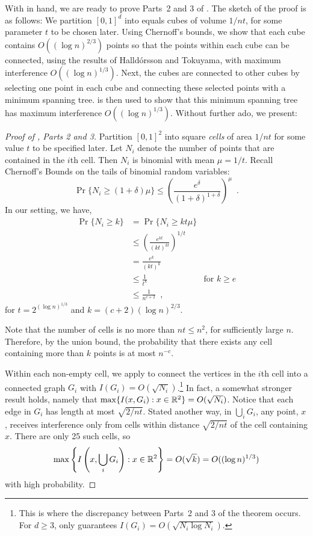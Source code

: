 \documentclass{patmorin}
\begin{document}
With  in hand, we are ready to prove Parts~2 and 3 of
.  The sketch of the proof is as follows:  We partition
$[0,1]^d$ into equals cubes of volume $1/nt$, for some parameter $t$
to be chosen later.  Using Chernoff's bounds, we show that each cube
contains $O((\log n)^{2/3})$ points so that the points within each cube
can be connected, using the results of Halld\'orsson and Tokuyama, with
maximum interference $O((\log n)^{1/3})$.  Next, the cubes are connected
to other cubes by selecting one point in each cube and connecting these
selected points with a minimum spanning tree.   is then
used to show that this minimum spanning tree has maximum interference
$O((\log n)^{1/3})$.  Without further ado, we present:

\begin{proof}[Proof of , Parts 2 and 3]
Partition $[0,1]^2$ into square \emph{cells} of area $1/nt$ for some
value $t$ to be specified later.  Let $N_i$ denote the number of points
that are contained in the $i$th cell.  Then $N_i$ is binomial
with mean $\mu=1/t$.  Recall Chernoff's Bounds \cite{c52} on the tails
of binomial random variables:
\[
  \Pr\{N_i \ge (1+\delta)\mu\} 
    \le \left(\frac{e^\delta}{(1+\delta)^{1+\delta}}\right)^\mu \enspace .
\]
In our setting, we have, 
\begin{align*}
  \Pr\{N_i \ge k\} 
    & = \Pr\{N_i \ge kt\mu\} \\
    & \le \left(\frac{e^{kt}}{(kt)^{kt}}\right)^{1/t} \\
    & = \frac{e^{k}}{(kt)^{k}} \\
    & \le \frac{1}{t^{k}} & \text{for $k\ge e$} \\
    & \le \frac{1}{n^{c+2}} \enspace , 
\end{align*}
for $t=2^{(\log n)^{1/3}}$ and $k=(c+2)(\log n)^{2/3}$.

Note that the number of cells is no more than $nt\le
n^2$, for sufficiently large $n$.  Therefore, by the union bound, the
probability that there exists any cell containing more than $k$ points
is at most $n^{-c}$.

Within each non-empty cell, we apply  to
connect the vertices in the $i$th cell into a connected graph $G_i$
with $I(G_i)=O(\sqrt{N_i})$.\footnote{This is where the discrepancy between Parts~2 and 3 of the theorem occurs.  For $d\ge 3$,  only guarantees $I(G_i)=O(\sqrt{N_i\log N_i})$.}  In fact, a somewhat stronger result holds,
namely that $\max\{I(x,G_i) : x\in\mathbb{R}^2\}=O(\sqrt{N_i})$.  Notice that
each edge in $G_i$ has length at most $\sqrt{2/nt}$.  Stated another
way, in $\bigcup_i G_i$, any point, $x$, receives interference only
from cells within distance $\sqrt{2/nt}$ of the cell containing $x$.
There are only 25 such cells, so
\[
  \max\left\{I\left(x,\bigcup_iG_i\right) : x\in\mathbb{R}^2\right\}=O(\sqrt{k}) 
    = O((\log n)^{1/3})
\]
with high probability.


\end{proof}
\end{document}
